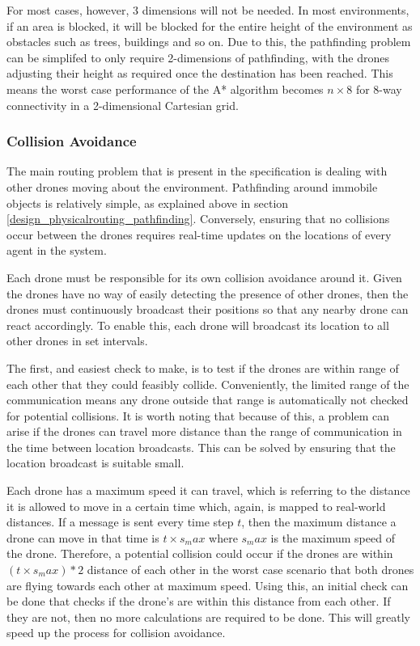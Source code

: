 For most cases, however, 3 dimensions will not be needed. In most environments, if an area is blocked, it will be blocked for the entire height of the environment as obstacles such as trees, buildings and so on. Due to this, the pathfinding problem can be simplifed to only require 2-dimensions of pathfinding, with the drones adjusting their height as required once the destination has been reached. This means the worst case performance of the A* algorithm becomes $n \times 8$ for 8-way connectivity in a 2-dimensional Cartesian grid.

\subsubsection{Collision Avoidance}
\label{sec:design_physicalrouting_collisionavoidance}
		
The main routing problem that is present in the specification is dealing with other drones moving about the environment. Pathfinding around immobile objects is relatively simple, as explained above in section \ref{design_physicalrouting_pathfinding}. Conversely, ensuring that no collisions occur between the drones requires real-time updates on the locations of every agent in the system.

Each drone must be responsible for its own collision avoidance around it. Given the drones have no way of easily detecting the presence of other drones, then the drones must continuously broadcast their positions so that any nearby drone can react accordingly. To enable this, each drone will broadcast its location to all other drones in set intervals.

The first, and easiest check to make, is to test if the drones are within range of each other that they could feasibly collide. Conveniently, the limited range of the communication means any drone outside that range is automatically not checked for potential collisions. It is worth noting that because of this, a problem can arise if the drones can travel more distance than the range of communication in the time between location broadcasts. This can be solved by ensuring that the location broadcast is suitable small.

Each drone has a maximum speed it can travel, which is referring to the distance it is allowed to move in a certain time which, again, is mapped to real-world distances. If a message is sent every time step $t$, then the maximum distance a drone can move in that time is $t \times s_max$ where $s_max$ is the maximum speed of the drone. Therefore, a potential collision could occur if the drones are within $(t \times s_max) * 2$ distance of each other in the worst case scenario that both drones are flying towards each other at maximum speed. Using this, an initial check can be done that checks if the drone's are within this distance from each other. If they are not, then no more calculations are required to be done. This will greatly speed up the process for collision avoidance.

